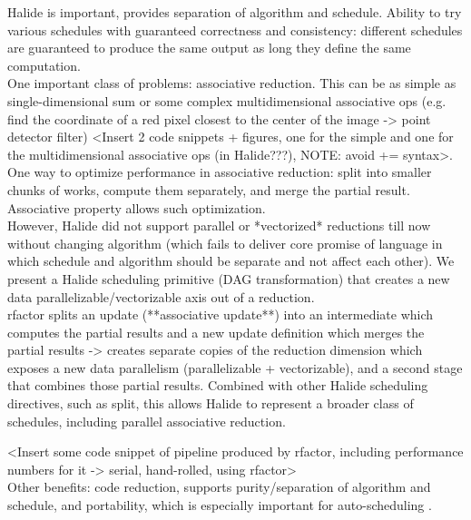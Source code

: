 Halide \cite{Ragan-Kelley:2013:HLC:2491956.2462176} is important, provides separation of algorithm and schedule. Ability to try various schedules with guaranteed correctness and consistency: different schedules are guaranteed to produce the same output as long they define the same computation. \\

One important class of problems: associative reduction. This can be as simple as single-dimensional sum or some complex multidimensional associative ops (e.g. find the coordinate of a red pixel closest to the center of the image -> point detector filter) <Insert 2 code snippets + figures, one for the simple and one for the multidimensional associative ops (in Halide???), NOTE: avoid += syntax>. One way to optimize performance in associative reduction: split into smaller chunks of works, compute them separately, and merge the partial result. Associative property allows such optimization. \\

However, Halide did not support parallel or *vectorized* reductions till now without changing algorithm (which fails to deliver core promise of language in which schedule and algorithm should be separate and not affect each other). We present a Halide scheduling primitive (DAG transformation) that creates a new data parallelizable/vectorizable axis out of a reduction. \\

rfactor splits an update (**associative update**) into an intermediate which computes the partial results and a new update definition which merges the partial results -> creates separate copies of the reduction dimension which exposes a new data parallelism (parallelizable + vectorizable), and a second stage that combines those partial results. Combined with other Halide scheduling directives, such as split, this allows Halide to represent a broader class of schedules, including parallel associative reduction. 

<Insert some code snippet of pipeline produced by rfactor, including performance numbers for it -> serial, hand-rolled, using rfactor> \\

Other benefits: code reduction, supports purity/separation of algorithm and schedule, and portability, which is especially important for auto-scheduling \cite{Mullapudi:2016:ASH:2897824.2925952}. \\
